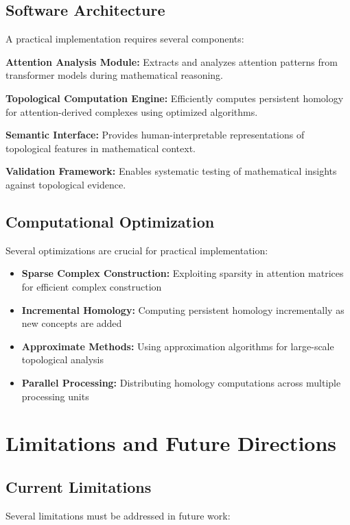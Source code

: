 \documentclass[11pt]{article}
\begin{document}
\subsection{Software Architecture}

A practical implementation requires several components:

\textbf{Attention Analysis Module:} Extracts and analyzes attention patterns from transformer models during mathematical reasoning.

\textbf{Topological Computation Engine:} Efficiently computes persistent homology for attention-derived complexes using optimized algorithms.

\textbf{Semantic Interface:} Provides human-interpretable representations of topological features in mathematical context.

\textbf{Validation Framework:} Enables systematic testing of mathematical insights against topological evidence.

\subsection{Computational Optimization}

Several optimizations are crucial for practical implementation:

\begin{itemize}
\item \textbf{Sparse Complex Construction:} Exploiting sparsity in attention matrices for efficient complex construction
\item \textbf{Incremental Homology:} Computing persistent homology incrementally as new concepts are added
\item \textbf{Approximate Methods:} Using approximation algorithms for large-scale topological analysis
\item \textbf{Parallel Processing:} Distributing homology computations across multiple processing units
\end{itemize}

\section{Limitations and Future Directions}

\subsection{Current Limitations}

Several limitations must be addressed in future work:
\end{document}
